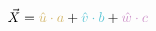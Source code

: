 \documentclass[preview]{standalone}
\begin{document}
$$\vec{X} = \textcolor[HTML]{d4b76b}{\hat{u}\cdot a} + \textcolor[HTML]{58c4d5}{\hat{v}\cdot b} + \textcolor[HTML]{ce93ca}{\hat{w}\cdot c}$$
\end{document}
